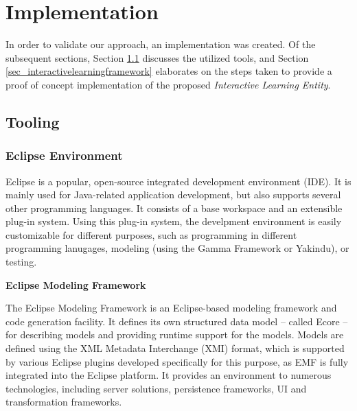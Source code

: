 \chapter{Implementation} \label{implementation}

In order to validate our approach, an implementation was created. Of the subsequent sections, Section \ref{sec_tooling} discusses the utilized tools, and Section \ref{sec_interactivelearningframework} elaborates on the steps taken to provide a proof of concept implementation of the proposed \textit{Interactive Learning Entity}.
\section{Tooling} \label{sec_tooling}

\subsection{Eclipse Environment} \label{subsec_emf}
Eclipse is a popular, open-source integrated development environment (IDE). It is mainly used for Java-related application development, but also supports several other programming languages. It consists of a base workspace and an extensible plug-in system. Using this plug-in system, the develpment environment is easily customizable for different purposes, such as programming in different programming lanugages, modeling (using the Gamma Framework or Yakindu), or testing.

\textbf{Eclipse Modeling Framework}

The Eclipse Modeling Framework is an Eclipse-based modeling framework and code generation facility. It defines its own structured data model -- called Ecore -- for describing models and providing runtime support for the models. Models are defined using the XML Metadata Interchange (XMI) format, which is supported by various Eclipse plugins developed specifically for this purpose, as EMF is fully integrated into the Eclipse platform. It provides an environment to numerous technologies, including server solutions, persistence frameworks, UI and transformation frameworks.


